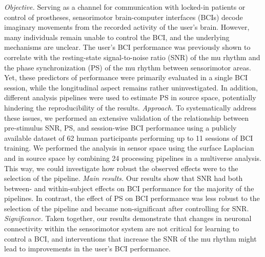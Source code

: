 \textit{Objective.} Serving as a channel for communication with locked-in patients or control of prostheses, sensorimotor brain-computer interfaces (BCIs) decode imaginary movements from the recorded activity of the user's brain. However, many individuals remain unable to control the BCI, and the underlying mechanisms are unclear. The user's BCI performance was previously shown to correlate with the resting-state signal-to-noise ratio (SNR) of the mu rhythm and the phase synchronization (PS) of the mu rhythm between sensorimotor areas. Yet, these predictors of performance were primarily evaluated in a single BCI session, while the longitudinal aspect remains rather uninvestigated. In addition, different analysis pipelines were used to estimate PS in source space, potentially hindering the reproducibility of the results. \textit{Approach.} To systematically address these issues, we performed an extensive validation of the relationship between pre-stimulus SNR, PS, and session-wise BCI performance using a publicly available dataset of 62 human participants performing up to 11 sessions of BCI training. We performed the analysis in sensor space using the surface Laplacian and in source space by combining 24 processing pipelines in a multiverse analysis. This way, we could investigate how robust the observed effects were to the selection of the pipeline. \textit{Main results.} Our results show that SNR had both between- and within-subject effects on BCI performance for the majority of the pipelines. In contrast, the effect of PS on BCI performance was less robust to the selection of the pipeline and became non-significant after controlling for SNR. \textit{Significance.} Taken together, our results demonstrate that changes in neuronal connectivity within the sensorimotor system are not critical for learning to control a BCI, and interventions that increase the SNR of the mu rhythm might lead to improvements in the user's BCI performance.

